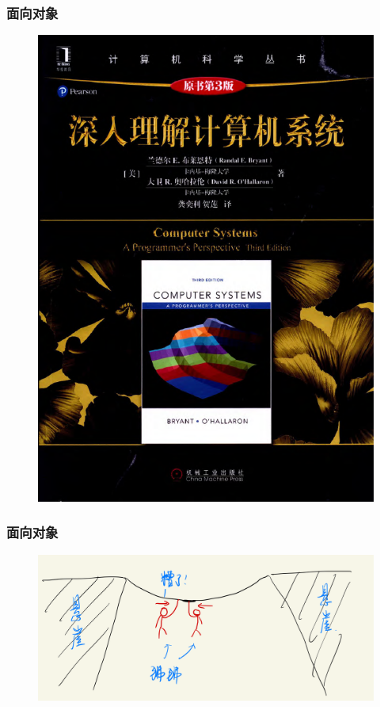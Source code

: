 \documentclass[AutoFakeBold]{beamer}
\begin{document}
{    \begin{frame}
        \frametitle{面向对象}
    
        \begin{figure}
            \includegraphics[height=.5\paperheight]{figures/3.png}
        \end{figure}
    
    \end{frame}

    \begin{frame}
        \frametitle{面向对象}
    
        \begin{figure}
            \includegraphics[height=.4\paperheight]{figures/4.png}
        \end{figure}
    

\end{frame}}
\end{document}

